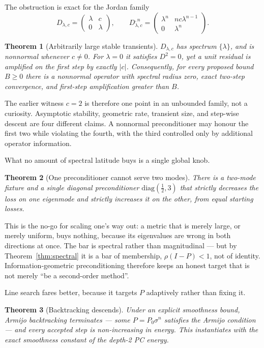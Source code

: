 \documentclass[11pt]{article}
\newtheorem{theorem}{Theorem}[section]
\begin{document}
The obstruction is exact for the Jordan family
\[
D_{\lambda,c}=\begin{pmatrix}\lambda&c\\0&\lambda\end{pmatrix},\qquad
D_{\lambda,c}^{,n}=
\begin{pmatrix}
\lambda^n&nc\lambda^{n-1}\\0&\lambda^n
\end{pmatrix}.
\]

\begin{theorem}[Arbitrarily large stable transients]\label{thm:jordan}
$D_{\lambda,c}$ has spectrum $\{\lambda\}$, and is nonnormal whenever $c\ne0$.
For $\lambda=0$ it satisfies $D^2=0$, yet a unit residual is amplified on the first
step by exactly $|c|$. Consequently, for every proposed bound $B\geq0$ there is a
nonnormal operator with spectral radius zero, exact two-step convergence, and first-step
amplification greater than $B$.
\end{theorem}

The earlier witness $c=2$ is therefore one point in an unbounded family, not a curiosity.
Asymptotic stability, geometric rate, transient size, and step-wise descent are four
different claims. A nonnormal preconditioner may honour the first two while violating
the fourth, with the third controlled only by additional operator information.

What no amount of spectral latitude buys is a single global knob.

\begin{theorem}[One preconditioner cannot serve two modes]\label{thm:mode}
There is a two-mode fixture and a single diagonal preconditioner
$\mathrm{diag}(\tfrac12, 3)$ that strictly \emph{decreases} the loss on one eigenmode and
strictly \emph{increases} it on the other, from equal starting losses.
\end{theorem}

This is the no-go for scaling one's way out: a metric that is merely large, or merely
uniform, buys nothing, because its eigenvalues are wrong in both directions at once. The
bar is spectral rather than magnitudinal --- but by Theorem~\ref{thm:spectral} it is a bar
of membership, $\rho(I-P)<1$, not of identity. Information-geometric preconditioning
therefore keeps an honest target that is not merely ``be a second-order method''.

Line search fares better, because it targets $P$ adaptively rather than fixing it.

\begin{theorem}[Backtracking descends]\label{thm:armijo}
Under an explicit smoothness bound, Armijo backtracking terminates --- some
$P = P_0\sigma^n$ satisfies the Armijo condition --- and every accepted step is
non-increasing in energy. This instantiates with the exact smoothness constant of the
depth-2 PC energy.
\end{theorem}
\end{document}
